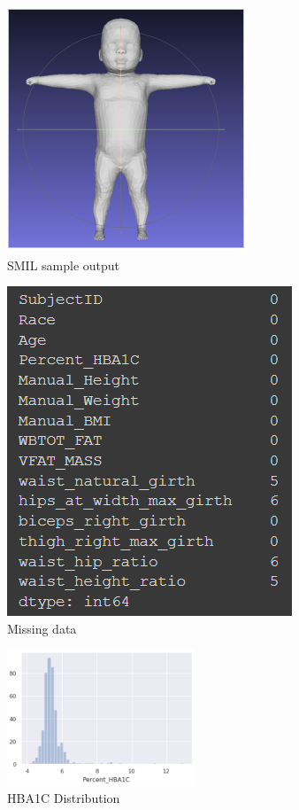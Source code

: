 \begin{figure}[h]
        \caption{SMIL sample output}
        \centering
        \includegraphics[]{images/smil.png}
\end{figure}

\begin{figure}[!htb]
        \caption{Missing data}
        \centering
        \includegraphics[]{images/missing_data.png}
\end{figure}

\begin{figure}[!htb]
        \caption{HBA1C Distribution}
        \centering
        \includegraphics[width=0.5\textwidth]{images/hba1c.png}
\end{figure}

